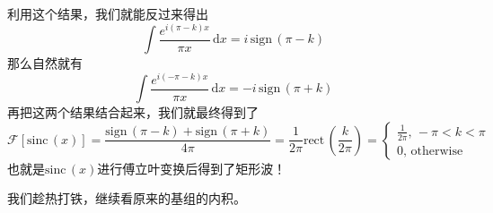 \documentclass[12pt,a4paper,openany,twoside]{book}
\numberwithin{equation}{section}
\newcommand{\sinc}[1]{\mathrm{sinc} \, (#1)}
\begin{document}
      利用这个结果，我们就能反过来得出
      \begin{equation}
      	\int \frac{e^{i(\pi-k)x}}{\pi x} \, \mathrm{d}x =  i \, \mathrm{sign}\, (\pi-k) 
      \end{equation}
      那么自然就有
      \begin{equation}
      	\int \frac{e^{i(-\pi-k)x}}{\pi x} \, \mathrm{d}x = - i \,\mathrm{sign}\, (\pi + k) 
      \end{equation}
      再把这两个结果结合起来，我们就最终得到了
      \begin{equation}
      	\mathcal{F}[\sinc{x}] = \frac{\mathrm{sign}\,(\pi-k)+ \mathrm{sign}\,(\pi+k)}{4 \pi}= \frac{1}{2 \pi}\mathrm{rect}\, (\frac{k}{2\pi}) =
      	\begin{cases}
      		 \frac{1}{2\pi}, \, -\pi < k < \pi \\
      		 0, \, \text{otherwise}
      	\end{cases}
      \end{equation}
      也就是$\sinc{x}$进行傅立叶变换后得到了矩形波！

      我们趁热打铁，继续看原来的基组的内积。
\end{document}
